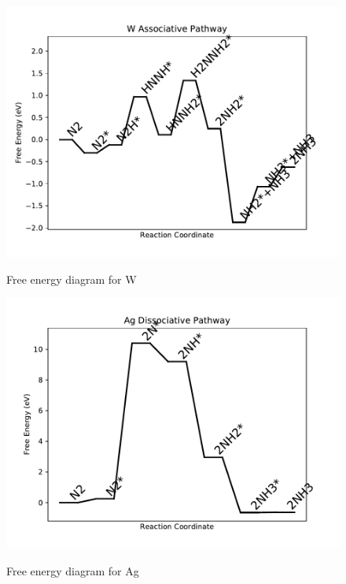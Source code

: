 \documentclass{article}
\begin{document}
\begin{figure}
\includegraphics[width=1\linewidth]{data/plots/W_associative.pdf}
\label{fig:W_associative}
\caption{Free energy diagram for W}
\end{figure}

\begin{figure}
\includegraphics[width=1\linewidth]{data/plots/Ag_dissociative.pdf}
\label{fig:Ag_dissociative}
\caption{Free energy diagram for Ag}
\end{figure}
\end{document}
